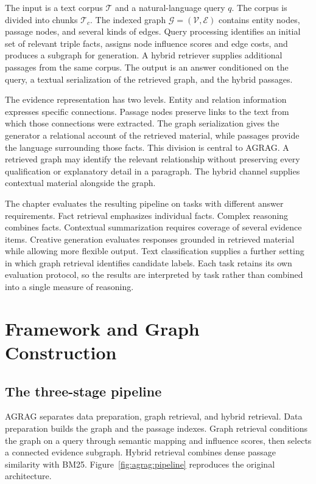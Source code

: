 The input is a text corpus $\mathcal{T}$ and a natural-language query $q$. The corpus is divided into chunks $\mathcal{T}_c$. The indexed graph $\mathcal{G}=(\mathcal{V},\mathcal{E})$ contains entity nodes, passage nodes, and several kinds of edges. Query processing identifies an initial set of relevant triple facts, assigns node influence scores and edge costs, and produces a subgraph for generation. A hybrid retriever supplies additional passages from the same corpus. The output is an answer conditioned on the query, a textual serialization of the retrieved graph, and the hybrid passages.

The evidence representation has two levels. Entity and relation information expresses specific connections. Passage nodes preserve links to the text from which those connections were extracted. The graph serialization gives the generator a relational account of the retrieved material, while passages provide the language surrounding those facts. This division is central to AGRAG. A retrieved graph may identify the relevant relationship without preserving every qualification or explanatory detail in a paragraph. The hybrid channel supplies contextual material alongside the graph.

The chapter evaluates the resulting pipeline on tasks with different answer requirements. Fact retrieval emphasizes individual facts. Complex reasoning combines facts. Contextual summarization requires coverage of several evidence items. Creative generation evaluates responses grounded in retrieved material while allowing more flexible output. Text classification supplies a further setting in which graph retrieval identifies candidate labels. Each task retains its own evaluation protocol, so the results are interpreted by task rather than combined into a single measure of reasoning.

\section{Framework and Graph Construction}
\label{sec:agrag:construction}
\subsection{The three-stage pipeline}
AGRAG separates data preparation, graph retrieval, and hybrid retrieval. Data preparation builds the graph and the passage indexes. Graph retrieval conditions the graph on a query through semantic mapping and influence scores, then selects a connected evidence subgraph. Hybrid retrieval combines dense passage similarity with BM25. Figure~\ref{fig:agrag:pipeline} reproduces the original architecture.

